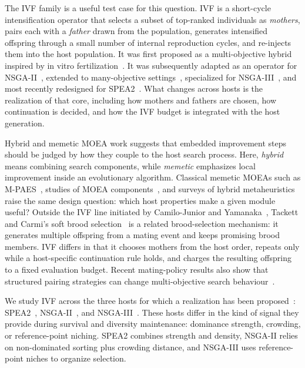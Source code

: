 \documentclass[runningheads]{llncs}
\begin{document}
The IVF family is a useful test case for this question. IVF is a short-cycle intensification operator that selects a subset of top-ranked individuals as \emph{mothers}, pairs each with a \emph{father} drawn from the population, generates intensified offspring through a small number of internal reproduction cycles, and re-injects them into the host population. It was first proposed as a multi-objective hybrid inspired by in vitro fertilization~\cite{camilo-junior2011}. It was subsequently adapted as an operator for NSGA-II~\cite{sampaio2017ivf}, extended to many-objective settings~\cite{sampaio2019ivf}, specialized for NSGA-III~\cite{Sampaio2024}, and most recently redesigned for SPEA2~\cite{zambrano2026ivfspea2}. What changes across hosts is the realization of that core, including how mothers and fathers are chosen, how continuation is decided, and how the IVF budget is integrated with the host generation.

Hybrid and memetic MOEA work suggests that embedded improvement steps should be judged by how they couple to the host search process. Here, \emph{hybrid} means combining search components, while \emph{memetic} emphasizes local improvement inside an evolutionary algorithm. Classical memetic MOEAs such as \mbox{M-PAES}~\cite{knowles2000memetic}, studies of MOEA components~\cite{bezerra2016automatic}, and surveys of hybrid metaheuristics~\cite{talbi2002taxonomy,blum2011hybrid} raise the same design question: which host properties make a given module useful? Outside the IVF line initiated by Camilo-Junior and Yamanaka~\cite{camilo-junior2011}, Tackett and Carmi's soft brood selection~\cite{tackett1994brood} is a related brood-selection mechanism: it generates multiple offspring from a mating event and keeps promising brood members. IVF differs in that it chooses mothers from the host order, repeats only while a host-specific continuation rule holds, and charges the resulting offspring to a fixed evaluation budget. Recent mating-policy results also show that structured pairing strategies can change multi-objective search behaviour~\cite{Lu2025}.

We study IVF across the three hosts for which a realization has been proposed~\cite{sampaio2017ivf,Sampaio2024,zambrano2026ivfspea2}: SPEA2~\cite{zitzler2001spea2}, NSGA-II~\cite{deb2002nsga2}, and NSGA-III~\cite{deb2014nsga3}. These hosts differ in the kind of signal they provide during survival and diversity maintenance: dominance strength, crowding, or reference-point niching. SPEA2 combines strength and density, NSGA-II relies on non-dominated sorting plus crowding distance, and NSGA-III uses reference-point niches to organize selection.
\end{document}
